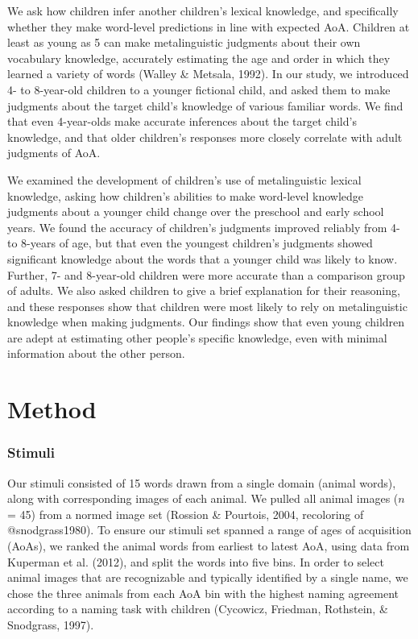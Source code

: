 \documentclass[10pt, letterpaper]{article}
\begin{document}
We ask how children infer another children's lexical knowledge, and
specifically whether they make word-level predictions in line with
expected AoA. Children at least as young as 5 can make metalinguistic
judgments about their own vocabulary knowledge, accurately estimating
the age and order in which they learned a variety of words (Walley \&
Metsala, 1992). In our study, we introduced 4- to 8-year-old children to
a younger fictional child, and asked them to make judgments about the
target child's knowledge of various familiar words. We find that even
4-year-olds make accurate inferences about the target child's knowledge,
and that older children's responses more closely correlate with adult
judgments of AoA.

We examined the development of children's use of metalinguistic lexical
knowledge, asking how children's abilities to make word-level knowledge
judgments about a younger child change over the preschool and early
school years. We found the accuracy of children's judgments improved
reliably from 4- to 8-years of age, but that even the youngest
children's judgments showed significant knowledge about the words that a
younger child was likely to know. Further, 7- and 8-year-old children
were more accurate than a comparison group of adults. We also asked
children to give a brief explanation for their reasoning, and these
responses show that children were most likely to rely on metalinguistic
knowledge when making judgments. Our findings show that even young
children are adept at estimating other people's specific knowledge, even
with minimal information about the other person.

\hypertarget{method}{%
\section{Method}\label{method}}

\hypertarget{stimuli}{%
\subsubsection{Stimuli}\label{stimuli}}

Our stimuli consisted of 15 words drawn from a single domain (animal
words), along with corresponding images of each animal. We pulled all
animal images (\(n\) = 45) from a normed image set (Rossion \& Pourtois,
2004, recoloring of @snodgrass1980). To ensure our stimuli set spanned a
range of ages of acquisition (AoAs), we ranked the animal words from
earliest to latest AoA, using data from Kuperman et al. (2012), and
split the words into five bins. In order to select animal images that
are recognizable and typically identified by a single name, we chose the
three animals from each AoA bin with the highest naming agreement
according to a naming task with children (Cycowicz, Friedman, Rothstein,
\& Snodgrass, 1997).
\end{document}
